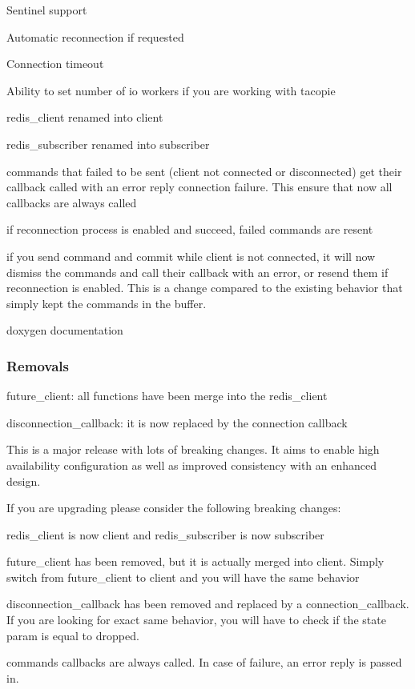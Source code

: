 \begin{DoxyItemize}
\item Sentinel support
\item Automatic reconnection if requested
\item Connection timeout
\item Ability to set number of io workers if you are working with tacopie
\item {\ttfamily redis\+\_\+client} renamed into {\ttfamily client}
\item {\ttfamily redis\+\_\+subscriber} renamed into {\ttfamily subscriber}
\item commands that failed to be sent (client not connected or disconnected) get their callback called with an error reply {\ttfamily connection failure}. This ensure that now all callbacks are always called
\item if reconnection process is enabled and succeed, failed commands are resent
\item if you send command and commit while client is not connected, it will now dismiss the commands and call their callback with an error, or resend them if reconnection is enabled. This is a change compared to the existing behavior that simply kept the commands in the buffer.
\item doxygen documentation \subsubsection*{Removals}
\end{DoxyItemize}


\begin{DoxyItemize}
\item future\+\_\+client\+: all functions have been merge into the redis\+\_\+client
\item disconnection\+\_\+callback\+: it is now replaced by the connection callback
\end{DoxyItemize}

This is a major release with lots of breaking changes. It aims to enable high availability configuration as well as improved consistency with an enhanced design.

If you are upgrading please consider the following breaking changes\+:
\begin{DoxyItemize}
\item {\ttfamily redis\+\_\+client} is now {\ttfamily client} and {\ttfamily redis\+\_\+subscriber} is now {\ttfamily subscriber}
\item {\ttfamily future\+\_\+client} has been removed, but it is actually merged into {\ttfamily client}. Simply switch from {\ttfamily future\+\_\+client} to {\ttfamily client} and you will have the same behavior
\item {\ttfamily disconnection\+\_\+callback} has been removed and replaced by a {\ttfamily connection\+\_\+callback}. If you are looking for exact same behavior, you will have to check if the state param is equal to {\ttfamily dropped}.
\item commands callbacks are always called. In case of failure, an error reply is passed in.
\end{DoxyItemize}


